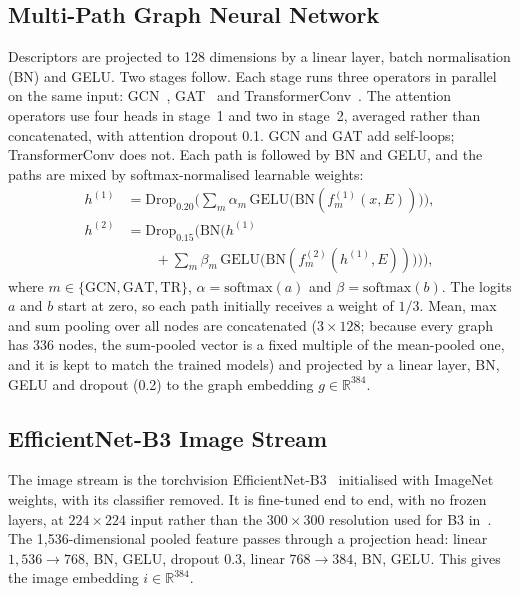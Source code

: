 \documentclass[journal,onecolumn]{IEEEtran}
\newcommand{\R}{\mathbb{R}}
\begin{document}
\subsection{Multi-Path Graph Neural Network}
Descriptors are projected to 128 dimensions by a linear layer, batch normalisation (BN) and GELU. Two stages follow. Each stage runs three operators in parallel on the same input: GCN~\cite{kipf2017gcn}, GAT~\cite{velickovic2018gat} and TransformerConv~\cite{shi2021masked}. The attention operators use four heads in stage~1 and two in stage~2, averaged rather than concatenated, with attention dropout 0.1. GCN and GAT add self-loops; TransformerConv does not. Each path is followed by BN and GELU, and the paths are mixed by softmax-normalised learnable weights:
\begin{align}
h^{(1)} &= \mathrm{Drop}_{0.20}\Big( \sum_{m} \alpha_m \, \mathrm{GELU}\big(\mathrm{BN}(f^{(1)}_m(x, E))\big) \Big), \\
h^{(2)} &= \mathrm{Drop}_{0.15}\Big( \mathrm{BN}\Big( h^{(1)} \nonumber \\ &\qquad + \sum_{m} \beta_m \, \mathrm{GELU}\big(\mathrm{BN}(f^{(2)}_m(h^{(1)}, E))\big) \Big) \Big),
\end{align}
where $m \in \{\mathrm{GCN}, \mathrm{GAT}, \mathrm{TR}\}$, $\alpha = \mathrm{softmax}(a)$ and $\beta = \mathrm{softmax}(b)$. The logits $a$ and $b$ start at zero, so each path initially receives a weight of $1/3$. Mean, max and sum pooling over all nodes are concatenated ($3 \times 128$; because every graph has 336 nodes, the sum-pooled vector is a fixed multiple of the mean-pooled one, and it is kept to match the trained models) and projected by a linear layer, BN, GELU and dropout (0.2) to the graph embedding $g \in \R^{384}$.

\subsection{EfficientNet-B3 Image Stream}
The image stream is the torchvision EfficientNet-B3~\cite{tan2019efficientnet} initialised with ImageNet weights, with its classifier removed. It is fine-tuned end to end, with no frozen layers, at $224 \times 224$ input rather than the $300 \times 300$ resolution used for B3 in~\cite{tan2019efficientnet}. The 1,536-dimensional pooled feature passes through a projection head: linear $1{,}536 \to 768$, BN, GELU, dropout 0.3, linear $768 \to 384$, BN, GELU. This gives the image embedding $i \in \R^{384}$.
\end{document}

